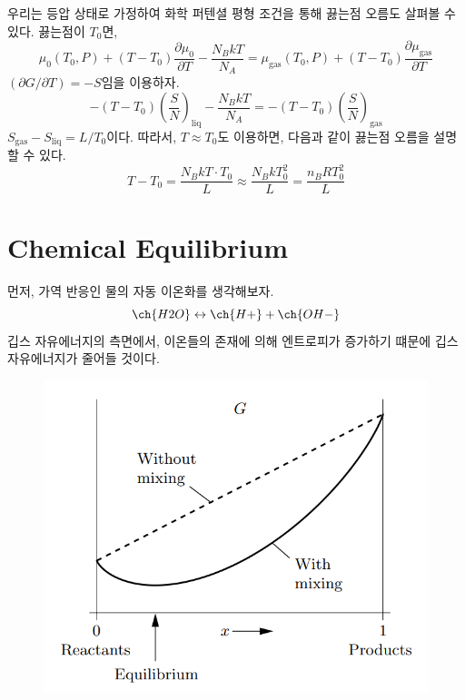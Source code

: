 \documentclass{article}
\begin{document}
우리는 등압 상태로 가정하여 화학 퍼텐셜 평형 조건을 통해 끓는점 오름도 살펴볼 수 있다. 끓는점이 $T_0$면,
\begin{equation}
    \mu_0 (T_0, P) + (T-T_0) \frac{\partial \mu_0}{\partial T} - \frac{N_B kT}{N_A} = \mu_\text{gas} (T_0, P) + (T-T_0) \frac{\partial \mu_\text{gas}}{\partial T}
\end{equation}
$(\partial G / \partial T) = -S$임을 이용하자.
\begin{equation}
    -(T-T_0) \left( \frac{S}{N} \right)_{\text{liq}} - \frac{N_B kT}{N_A} = - (T- T_0) \left( \frac{S}{N} \right)_{\text{gas}}
\end{equation}
$S_\text{gas} - S_\text{liq} = L/T_0$이다. 따라서, $T\approx T_0$도 이용하면, 다음과 같이 끓는점 오름을 설명할 수 있다.
\begin{equation}
    T - T_0 = \frac{N_B kT \cdot T_0}{L} \approx \frac{N_B kT_0^2}{L} = \frac{n_B R T_0^2}{L}
\end{equation}


\newpage

\section{Chemical Equilibrium}

먼저, 가역 반응인 물의 자동 이온화를 생각해보자.
\begin{equation}
    \ch{H2 O} \leftrightarrow \ch{H+} + \ch{OH-}
\end{equation}
깁스 자유에너지의 측면에서, 이온들의 존재에 의해 엔트로피가 증가하기 떄문에 깁스 자유에너지가 줄어들 것이다.

\begin{figure}[h]
    \centering
    \includegraphics[width=0.45\linewidth]{images/fig6_1.png}
\end{figure}
\end{document}
